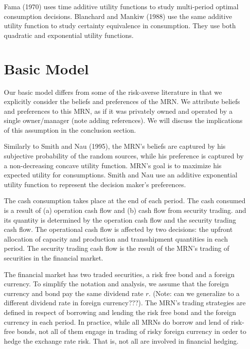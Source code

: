 \documentclass{article}[12pt letter]
\begin{document}
Fama (1970) uses time additive utility functions to study multi-period optimal consumption decisions.  Blanchard and Mankiw (1988) use the same additive utility function to study certainty equivalence in consumption. They use both quadratic and exponential utility functions.

\section{Basic Model \label{sect:basicModel}}


Our basic model differs from some of the risk-averse literature in that we explicitly consider the beliefs and preferences of the MRN. We attribute beliefs and preferences to this MRN, as if it was privately owned and operated by a single owner/manager (note adding references). We will discuss the implications of this assumption in the conclusion section.

Similarly to Smith and Nau (1995), the MRN's beliefs are captured by his subjective probability of the random sources, while his preference is captured by a non-decreasing concave utility function. MRN's goal is to maximize his expected utility for consumptions. Smith and Nau use an additive exponential utility function to represent the decision maker's preferences.


The cash consumption takes place at the end of each period. The cash consumed is  a result of (a) operation cash flow and (b) cash flow from security trading.  and its quantity is determined by the operation cash flow and the security trading cash flow. The operational cash flow is affected by two decisions: the upfront allocation of capacity and production and transshipment quantities in each period.  The security trading cash flow is the result of the MRN's trading of securities in the financial market.

The financial market has two traded securities, a risk free bond and a foreign currency. To simplify the notation and analysis, we assume that the foreign currency and bond pay the same dividend rate $r$.  (Note: can we generalize to a different dividend rate in foreign currency???). The MRN's trading strategies are defined in respect of  borrowing and lending the risk free bond and the foreign currency in each period. In practice, while all MRNs do borrow and lend of risk-free bonds, not all of them engage in trading of risky foreign currency in order to hedge the exchange rate risk. That is, not all are involved in financial hedging.
\end{document}

